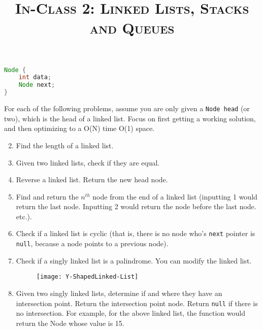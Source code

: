 \documentclass{article}
\title{\large{\textsc{In-Class 2: Linked Lists, Stacks and Queues}}}
\date{}
\begin{document}
\maketitle


\begin{lstlisting}[language=Java]
Node {
    int data;
    Node next;
}

\end{lstlisting}

\noindent For each of the following problems, assume you are only given a \texttt{Node head} (or two), which is the head of a linked list. Focus on first getting a working solution, and then optimizing to a O(N) time O(1) space.

\begin{enumerate}

\setcounter{enumi}{1}

\item Find the length of a linked list.
    
\item Given two linked lists, check if they are equal.
    
\item Reverse a linked list. Return the new head node.

\item Find and return the $n^{th}$ node from the end of a linked list (inputting 1 would return the last node. Inputting 2 would return the node before the last node. etc.).

\item Check if a linked list is cyclic (that is, there is no node who's \texttt{next} pointer is \texttt{null}, because a node points to a previous node).

\item Check if a singly linked list is a palindrome. You can modify the linked list.

\begin{figure}[h!]
\texttt{[image: Y-ShapedLinked-List]}
\centering
\end{figure}

\item Given two singly linked lists, determine if and where they have an intersection point. Return the intersection point node. Return \texttt{null} if there is no intersection. For example, for the above linked list, the function would return the Node whose value is 15.

\end{enumerate}
\end{document}

